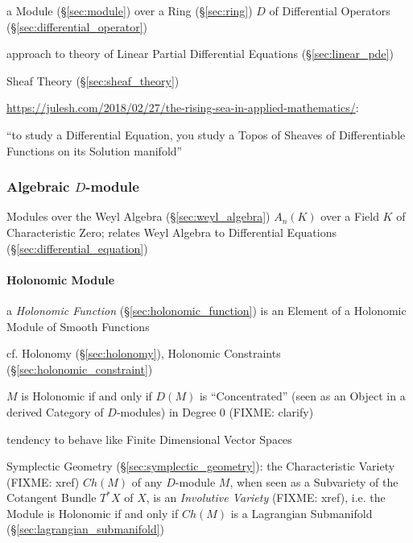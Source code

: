 a Module (\S\ref{sec:module}) over a Ring (\S\ref{sec:ring}) $D$ of Differential
Operators (\S\ref{sec:differential_operator})

approach to theory of Linear Partial Differential Equations
(\S\ref{sec:linear_pde})

Sheaf Theory (\S\ref{sec:sheaf_theory})

\url{https://julesh.com/2018/02/27/the-rising-sea-in-applied-mathematics/}:

``to study a Differential Equation, you study a Topos of Sheaves of
Differentiable Functions on its Solution manifold''



\subsubsection{Algebraic $D$-module}\label{sec:algebraic_d_module}

Modules over the Weyl Algebra (\S\ref{sec:weyl_algebra}) $A_n(K)$ over a Field
$K$ of Characteristic Zero; relates Weyl Algebra to Differential Equations
(\S\ref{sec:differential_equation})



\paragraph{Holonomic Module}\label{sec:holonomic_module}\hfill

a \emph{Holonomic Function} (\S\ref{sec:holonomic_function}) is an Element of a
Holonomic Module of Smooth Functions

\fist cf. Holonomy (\S\ref{sec:holonomy}), Holonomic Constraints
(\S\ref{sec:holonomic_constraint})

$M$ is Holonomic if and only if $D(M)$ is ``Concentrated'' (seen as an Object
in a derived Category of $D$-modules) in Degree $0$ (FIXME: clarify)

tendency to behave like Finite Dimensional Vector Spaces

\fist Symplectic Geometry (\S\ref{sec:symplectic_geometry}): the Characteristic
Variety (FIXME: xref) $Ch(M)$ of any $D$-module $M$, when seen as a Subvariety
of the Cotangent Bundle $T^*X$ of $X$, is an \emph{Involutive Variety} (FIXME:
xref), i.e. the Module is Holonomic if and only if $Ch(M)$ is a Lagrangian
Submanifold (\S\ref{sec:lagrangian_submanifold})



